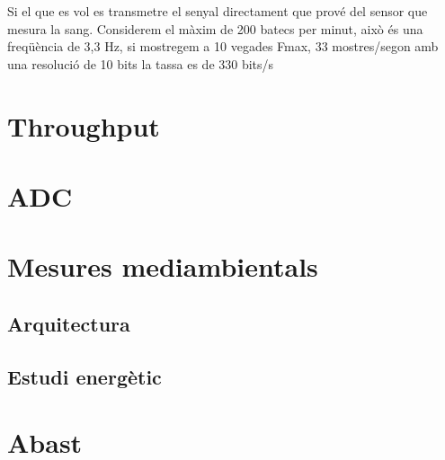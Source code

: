 Si el que es vol es transmetre el senyal directament que prové del sensor que mesura la sang.
Considerem el màxim de 200 batecs per minut, això és una freqüència de 3,3 Hz, si mostregem a 10 vegades Fmax, 33 mostres/segon amb una resolució de 10 bits la tassa es de 330 bits/s

\section{Throughput}
\section{ADC}


\section{Mesures mediambientals}
\subsection{Arquitectura}
\subsection{Estudi energètic}
\section{Abast}
